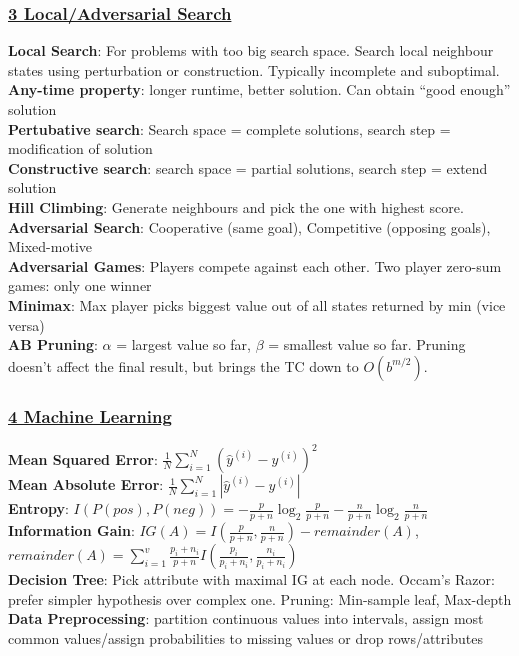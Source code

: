 \documentclass{article}
\begin{document}
{\begin{multicols*}{3}
\subsubsection*{\underline{3 Local/Adversarial Search}}
\textbf{Local Search}: For problems with too big search space. Search local neighbour states using perturbation or construction. Typically incomplete and suboptimal. \textbf{Any-time property}: longer runtime, better solution. Can obtain “good enough” solution\\
\textbf{Pertubative search}: Search space = complete solutions, search step = modification of solution\\
\textbf{Constructive search}: search space = partial solutions, search step = extend solution\\
\textbf{Hill Climbing}: Generate neighbours and pick the one with highest score. \\
\textbf{Adversarial Search}: Cooperative (same goal), Competitive (opposing goals), Mixed-motive\\
\textbf{Adversarial Games}: Players compete against each other. Two player zero-sum games: only one winner\\
\textbf{Minimax}: Max player picks biggest value out of all states returned by min (vice versa) \\
\textbf{AB Pruning}: $\alpha$ = largest value so far, $\beta$ =  smallest value so far. Pruning doesn’t affect the final result, but brings the TC down to $O(b^{m/2})$.
\subsubsection*{\underline{4 Machine Learning}}
\textbf{Mean Squared Error}: $\frac{1}{N}\sum_{i=1}^N(\hat{y}^{(i)}-y^{(i)})^2$ \\
\textbf{Mean Absolute Error}: $\frac{1}{N}\sum_{i=1}^N|\hat{y}^{(i)}-y^{(i)}|$ \\
\textbf{Entropy}: $I(P(pos),P(neg))=-\frac{p}{p+n}\log_2\frac{p}{p+n}-\frac{n}{p+n}\log_2\frac{n}{p+n}$\\
\textbf{Information Gain}: $IG(A)=I(\frac{p}{p+n},\frac{n}{p+n})-remainder(A)$, $remainder(A)=\sum_{i=1}^v\frac{p_i+n_i}{p+n}I(\frac{p_i}{p_i+n_i}, \frac{n_i}{p_i+n_i})$ \\
\textbf{Decision Tree}: Pick attribute with maximal IG at each node. Occam’s Razor: prefer simpler hypothesis over complex one. Pruning: Min-sample leaf, Max-depth\\
\textbf{Data Preprocessing}: partition continuous values into intervals, assign most common values/assign probabilities to missing values or drop rows/attributes

\end{multicols*}}
\end{document}

